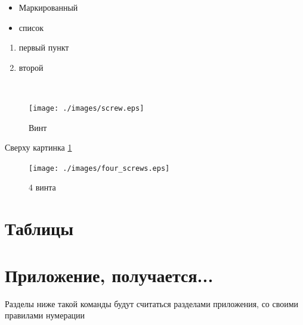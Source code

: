 \begin{itemize}
  \item Маркированный
  \item список
\end{itemize}

\begin{enumerate}
  \item первый пункт
  \item второй
\end{enumerate}

\lipsum[3]\\
\lipsum[2]

\begin{figure}[h!]
  \centering
  \texttt{[image: ./images/screw.eps]}
  \caption{Винт}
  \label{figure:screw}
\end{figure}

\clearpage %

Сверху картинка \ref{figure:screw}

\begin{figure}[h!]
  \centering
  \texttt{[image: ./images/four\_screws.eps]}
  \caption{4 винта}
  \label{figure:four_screws}
\end{figure}


\section{Таблицы}

\thispagestyle{empty}

\appendix
\section{Приложение, получается...}
Разделы ниже такой команды будут считаться разделами приложения, со своими
правилами нумерации



